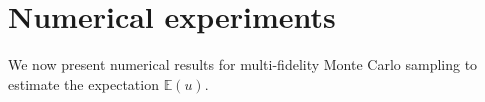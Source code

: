 \documentclass[final,3p,times,11pt]{elsarticle}
\newtheorem{theorem}{Theorem}%
\begin{document}

    



\section{Numerical experiments}\label{sec:Num-Exp}
%
We now present numerical results for multi-fidelity Monte Carlo sampling to estimate the expectation $\mathbb{E}(u)$. 
\end{document}
